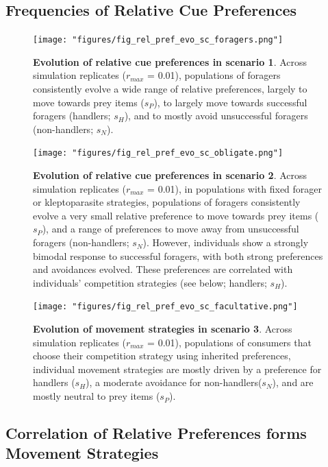 \documentclass[]{article}
\begin{document}
\hypertarget{frequencies-of-relative-cue-preferences}{%
\subsection{Frequencies of Relative Cue Preferences}\label{frequencies-of-relative-cue-preferences}}

\begin{figure}
\centering
\texttt{[image: "figures/fig\_rel\_pref\_evo\_sc\_foragers.png"]}
\caption{\textbf{Evolution of relative cue preferences in scenario 1}. Across simulation replicates (\(r_{max}\) = 0.01), populations of foragers consistently evolve a wide range of relative preferences, largely to move towards prey items (\(s_P\)), to largely move towards successful foragers (handlers; \(s_H\)), and to mostly avoid unsuccessful foragers (non-handlers; \(s_N\)).}
\end{figure}

\begin{figure}
\centering
\texttt{[image: "figures/fig\_rel\_pref\_evo\_sc\_obligate.png"]}
\caption{\textbf{Evolution of relative cue preferences in scenario 2}. Across simulation replicates (\(r_{max}\) = 0.01), in populations with fixed forager or kleptoparasite strategies, populations of foragers consistently evolve a very small relative preference to move towards prey items (\(s_P\)), and a range of preferences to move away from unsuccessful foragers (non-handlers; \(s_N\)). However, individuals show a strongly bimodal response to successful foragers, with both strong preferences and avoidances evolved. These preferences are correlated with individuals' competition strategies (see below; handlers; \(s_H\)).}
\end{figure}

\begin{figure}
\centering
\texttt{[image: "figures/fig\_rel\_pref\_evo\_sc\_facultative.png"]}
\caption{\textbf{Evolution of movement strategies in scenario 3}. Across simulation replicates (\(r_{max}\) = 0.01), populations of consumers that choose their competition strategy using inherited preferences, individual movement strategies are mostly driven by a preference for handlers (\(s_H\)), a moderate avoidance for non-handlers(\(s_N\)), and are mostly neutral to prey items (\(s_P\)).}
\end{figure}

\newpage

\hypertarget{correlation-of-relative-preferences-forms-movement-strategies}{%
\subsection{Correlation of Relative Preferences forms Movement Strategies}\label{correlation-of-relative-preferences-forms-movement-strategies}}
\end{document}
